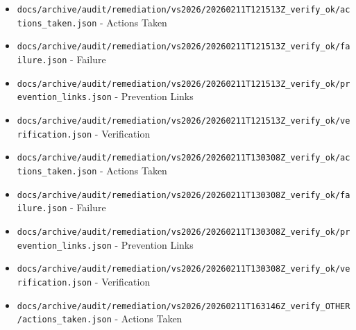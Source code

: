\documentclass[10.5pt,a4paper,openany]{book}
\begin{document}
\begin{itemize}
\item \texttt{docs/\allowbreak{}archive/\allowbreak{}audit/\allowbreak{}remediation/\allowbreak{}vs2026/\allowbreak{}20260211T121513Z\_\allowbreak{}verify\_\allowbreak{}ok/\allowbreak{}actions\_\allowbreak{}taken.\allowbreak{}json} -\allowbreak{} Actions Taken
\item \texttt{docs/\allowbreak{}archive/\allowbreak{}audit/\allowbreak{}remediation/\allowbreak{}vs2026/\allowbreak{}20260211T121513Z\_\allowbreak{}verify\_\allowbreak{}ok/\allowbreak{}failure.\allowbreak{}json} -\allowbreak{} Failure
\item \texttt{docs/\allowbreak{}archive/\allowbreak{}audit/\allowbreak{}remediation/\allowbreak{}vs2026/\allowbreak{}20260211T121513Z\_\allowbreak{}verify\_\allowbreak{}ok/\allowbreak{}prevention\_\allowbreak{}links.\allowbreak{}json} -\allowbreak{} Prevention Links
\item \texttt{docs/\allowbreak{}archive/\allowbreak{}audit/\allowbreak{}remediation/\allowbreak{}vs2026/\allowbreak{}20260211T121513Z\_\allowbreak{}verify\_\allowbreak{}ok/\allowbreak{}verification.\allowbreak{}json} -\allowbreak{} Verification
\item \texttt{docs/\allowbreak{}archive/\allowbreak{}audit/\allowbreak{}remediation/\allowbreak{}vs2026/\allowbreak{}20260211T130308Z\_\allowbreak{}verify\_\allowbreak{}ok/\allowbreak{}actions\_\allowbreak{}taken.\allowbreak{}json} -\allowbreak{} Actions Taken
\item \texttt{docs/\allowbreak{}archive/\allowbreak{}audit/\allowbreak{}remediation/\allowbreak{}vs2026/\allowbreak{}20260211T130308Z\_\allowbreak{}verify\_\allowbreak{}ok/\allowbreak{}failure.\allowbreak{}json} -\allowbreak{} Failure
\item \texttt{docs/\allowbreak{}archive/\allowbreak{}audit/\allowbreak{}remediation/\allowbreak{}vs2026/\allowbreak{}20260211T130308Z\_\allowbreak{}verify\_\allowbreak{}ok/\allowbreak{}prevention\_\allowbreak{}links.\allowbreak{}json} -\allowbreak{} Prevention Links
\item \texttt{docs/\allowbreak{}archive/\allowbreak{}audit/\allowbreak{}remediation/\allowbreak{}vs2026/\allowbreak{}20260211T130308Z\_\allowbreak{}verify\_\allowbreak{}ok/\allowbreak{}verification.\allowbreak{}json} -\allowbreak{} Verification
\item \texttt{docs/\allowbreak{}archive/\allowbreak{}audit/\allowbreak{}remediation/\allowbreak{}vs2026/\allowbreak{}20260211T163146Z\_\allowbreak{}verify\_\allowbreak{}OTHER/\allowbreak{}actions\_\allowbreak{}taken.\allowbreak{}json} -\allowbreak{} Actions Taken

\end{itemize}
\end{document}
